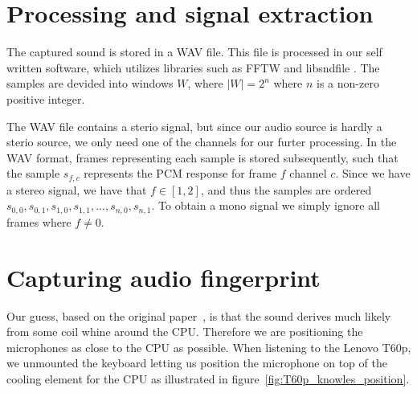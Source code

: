 \section{Processing and signal extraction}\label{sec:ch3_processing_signal_extraction}

The captured sound is stored in a WAV file.
This file is processed in our self written software, which utilizes libraries such as FFTW  and libsndfile .
The samples are devided into windows \( W \), where \( \lvert W \rvert = 2^{n} \) where \( n \) is a non-zero positive integer.

The WAV file contains a sterio signal, but since our audio source is hardly a sterio source, we only need one of the channels for our furter processing.  
In the WAV format, frames representing each sample is stored subsequently, such that the sample \( s_{f,c} \) represents the PCM  response for frame \( f \) channel \( c \). 
Since we have a stereo signal, we have that \( f \in \left [ 1, 2 \right ]  \), and thus the samples are ordered  \( s_{0,0}, s_{0,1}, s_{1,0}, s_{1,1}, ... , s_{n,0}, s_{n,1} \). 
To obtain a mono signal we simply ignore all frames where \( f \neq 0 \).

\section{Capturing audio fingerprint}\label{sec:ch3_capturing_audio_fingerprint}

Our guess, based on the original paper~\cite{original_paper}, is that the sound derives much likely from some coil whine around the CPU. 
Therefore we are positioning the microphones as close to the CPU as possible. 
When listening to the Lenovo T60p, we unmounted the keyboard letting us position the microphone on top of the cooling element for the CPU as illustrated in figure~\ref{fig:T60p_knowles_position}. 




